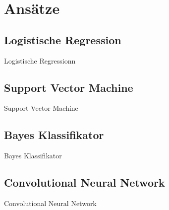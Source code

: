 \documentclass[aspectratio=169]{beamer} %
\begin{document}
\section{Ans\"atze}

\subsection{Logistische Regression}

\begin{frame}{Logistische Regressionn}
    
\end{frame}

\subsection{Support Vector Machine}

\begin{frame}{Support Vector Machine}
    
\end{frame}

\subsection{Bayes Klassifikator}

\begin{frame}{Bayes Klassifikator}
    
\end{frame}

\subsection{Convolutional Neural Network}

\begin{frame}{Convolutional Neural Network}
    
\end{frame}
\end{document}
